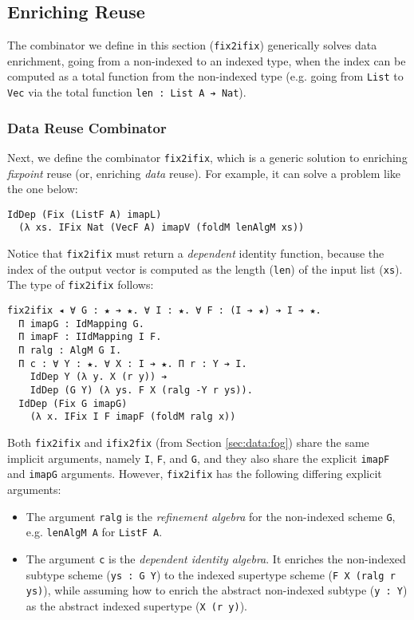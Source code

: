 \documentclass[acmsmall,screen]{acmart}
\newcommand{\refsec}[1]{Section \ref{sec:#1}}
\newcommand{\labsec}[1]{\label{sec:#1}}
\begin{document}
\subsection{Enriching Reuse}
\labsec{data:enr}

The combinator we define in this section
(\verb;fix2ifix;) generically solves data enrichment, going from a
non-indexed to an indexed type, when the index can be
computed as a total function from the non-indexed type
(e.g. going from \verb;List; to \verb;Vec; via the total function
\verb;len : List A ➔ Nat;).

\subsubsection{Data Reuse Combinator}

Next, we define the combinator \verb;fix2ifix;, which
is a generic solution
to enriching \textit{fixpoint} reuse
(or, enriching \textit{data} reuse).
For example, it can solve a problem like the one below:
\begin{verbatim}
IdDep (Fix (ListF A) imapL)
  (λ xs. IFix Nat (VecF A) imapV (foldM lenAlgM xs))
\end{verbatim}
Notice that \verb;fix2ifix; must return a \textit{dependent} identity
function, because the index of the output vector is computed as the
length (\verb;len;) of the input list (\verb;xs;).
The type of \verb;fix2ifix; follows:
\begin{verbatim}
fix2ifix ◂ ∀ G : ★ ➔ ★. ∀ I : ★. ∀ F : (I ➔ ★) ➔ I ➔ ★.
  Π imapG : IdMapping G.
  Π imapF : IIdMapping I F. 
  Π ralg : AlgM G I. 
  Π c : ∀ Y : ★. ∀ X : I ➔ ★. Π r : Y ➔ I. 
    IdDep Y (λ y. X (r y)) ➔ 
    IdDep (G Y) (λ ys. F X (ralg -Y r ys)).
  IdDep (Fix G imapG) 
    (λ x. IFix I F imapF (foldM ralg x))
\end{verbatim}
Both \verb;fix2ifix; and \verb;ifix2fix; (from \refsec{data:fog})
share the same implicit arguments, namely \verb;I;, \verb;F;,
and \verb;G;, and they also share the explicit \verb;imapF; and
\verb;imapG; arguments. However, \verb;fix2ifix; has the following
differing explicit arguments:

\begin{itemize}
\item The argument \verb;ralg; is the
  \textit{refinement algebra} for the non-indexed scheme \verb;G;,
  e.g. \verb;lenAlgM A; for \verb;ListF A;.

\item The argument \verb;c; is the \textit{dependent identity algebra}. It
  enriches the non-indexed subtype scheme (\verb;ys : G Y;)
  to the indexed supertype scheme (\verb;F X (ralg r ys);),
  while assuming
  how to enrich the abstract non-indexed subtype (\verb;y : Y;) as
  the abstract indexed supertype (\verb;X (r y);).
\end{itemize}
\end{document}
